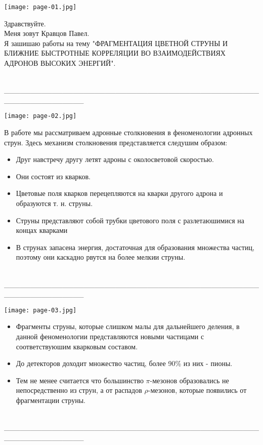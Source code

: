 \documentclass[12pt]{article}
\def\p{$\pi$}
\def\ro{$\rho$}
\renewcommand{\line}{\\ \_\_\_\_\_\_\_\_\_\_\_\_\_\_\_\_\_\_\_\_\_\_\_\_\_\_\_\_\_\_\_\_\_\_\_\_\_\_\_\_\_\_\_\_\_\_\_\_\_\_\_\_\_\_\_\_\_\_\_\_\_\_\_ \\ }
\begin{document}
\begin{minipage}[h]{0.39\linewidth}
	\texttt{[image: page-01.jpg]}
\end{minipage}
\begin{minipage}[h]{0.6\linewidth}
	Здравствуйте.\\
	Меня зовут Кравцов Павел. \\
	Я зашишаю работы на тему "ФРАГМЕНТАЦИЯ ЦВЕТНОЙ СТРУНЫ И БЛИЖНИЕ БЫСТРОТНЫЕ КОРРЕЛЯЦИИ ВО ВЗАИМОДЕЙСТВИЯХ АДРОНОВ ВЫСОКИХ ЭНЕРГИЙ".
\end{minipage}
\line

\begin{minipage}[h]{0.29\linewidth}
	\texttt{[image: page-02.jpg]}
\end{minipage}
\begin{minipage}[h]{0.7\linewidth}
	В работе мы рассматриваем адронные столкновения в феноменологии адронных струн. Здесь механизм столкновения представляется следушим образом:
	\begin{itemize}
		\item Друг навстречу другу летят адроны с околосветовой скоростью.
		\item Они состоят из кварков.
		\item Цветовые поля кварков перецепляются на кварки другого адрона и образуются т. н. струны.
		\item Струны представляют собой трубки цветового поля с разлетаюшимися на концах кварками
		\item В струнах запасена энергия, достаточная для образования множества частиц, поэтому они каскадно рвутся на более мелкии струны.
	\end{itemize}
\end{minipage}
\line

\begin{minipage}[h]{0.39\linewidth}
	\texttt{[image: page-03.jpg]}
\end{minipage}
\begin{minipage}[h]{0.6\linewidth}
	\begin{itemize}
		\item Фрагменты струны, которые слишком малы для дальнейшего деления, в данной феноменологии представляются новыми частицами с соответствуюшим кварковым составом.
		\item До детекторов доходит множество частиц, более 90\% из них - пионы.
		\item Тем не менее считается что большинство \p-мезонов образовались не непосредственно из струн, а от распадов \ro-мезонов, которые появились от фрагментации струны.
	\end{itemize}
\end{minipage}
\line
\end{document}
